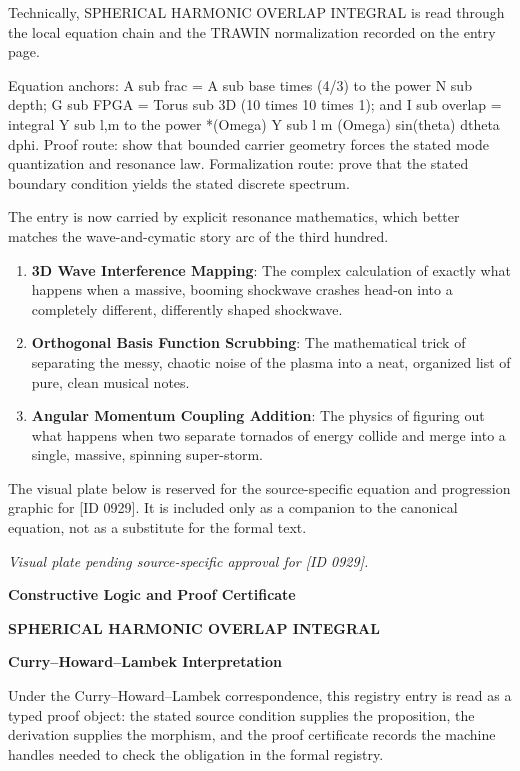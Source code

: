 Technically, SPHERICAL HARMONIC OVERLAP INTEGRAL is read through the local equation chain and the TRAWIN normalization recorded on the entry page.

Equation anchors: A sub frac = A sub base times (4/3) to the power N sub depth; G sub FPGA = Torus sub 3D (10 times 10 times 1); and I sub overlap = integral Y sub l,m to the power *(Omega) Y sub l m (Omega) sin(theta) dtheta dphi. Proof route: show that bounded carrier geometry forces the stated mode quantization and resonance law. Formalization route: prove that the stated boundary condition yields the stated discrete spectrum.

The entry is now carried by explicit resonance mathematics, which better matches the wave-and-cymatic story arc of the third hundred.
\endgroup

\begin{enumerate}[leftmargin=1.6em,itemsep=6pt,topsep=4pt]
\item \textbf{3D Wave Interference Mapping}: The complex calculation of exactly what happens when a massive, booming shockwave crashes head-on into a completely different, differently shaped shockwave.
\item \textbf{Orthogonal Basis Function Scrubbing}: The mathematical trick of separating the messy, chaotic noise of the plasma into a neat, organized list of pure, clean musical notes.
\item \textbf{Angular Momentum Coupling Addition}: The physics of figuring out what happens when two separate tornados of energy collide and merge into a single, massive, spinning super-storm.
\end{enumerate}

\begingroup\footnotesize\sloppy
The visual plate below is reserved for the source-specific equation and progression graphic for [ID 0929]. It is included only as a companion to the canonical equation, not as a substitute for the formal text.
\par\endgroup
\begingroup\footnotesize\itshape
Visual plate pending source-specific approval for [ID 0929].
\par\endgroup

\clearpage
\begingroup\tzpsupportsetup
\noindent\textbf{\fontsize{10.8pt}{12.8pt}\selectfont [ID 0929] Constructive Logic and Proof Certificate}\par
\noindent\textbf{\fontsize{10pt}{12pt}\selectfont SPHERICAL HARMONIC OVERLAP INTEGRAL}\par
\vspace{0.45em}
\begingroup
\footnotesize
\setlength{\parskip}{0.22em}
\setlength{\parindent}{0pt}
\noindent\textbf{Curry--Howard--Lambek Interpretation}\par
Under the Curry--Howard--Lambek correspondence, this registry entry is read as a typed proof
object: the stated source condition supplies the proposition, the derivation supplies the
morphism, and the proof certificate records the machine handles needed to check the obligation
in the formal registry.

